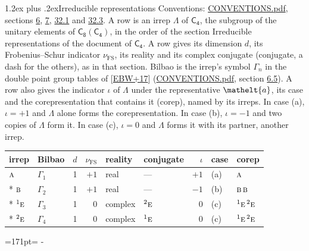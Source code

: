 \documentclass[10pt,a4paper]{article}
\makeatletter
\renewcommand\section{\@startsection{section}{1}{\z@}{-3ex plus -1ex minus -.2ex}%
  {1.2ex plus .2ex}{\normalfont\large\sffamily\bfseries\color{parttitle}}}
\newcommand{\needspace}[1]{\par\penalty-100\begingroup\dimen0=#1\relax\dimen2=\pagegoal
  \advance\dimen2-\pagetotal\ifdim\dimen0>\dimen2\relax\ifdim\dimen2>0pt\vfil\break\fi\fi
  \endgroup}
\numberwithin{equation}{section}
\newcommand{\eltfont}[1]{{\let\sigma\eltsigma\mathelt{#1}}}
\newcommand{\grp}[1]{\mathsf{#1}}
\newcommand{\irr}[1]{\text{\normalfont\scshape #1}}
\newcommand{\conjpair}[1]{{}^{#1}}
\newcommand{\elt}[1]{\eltfont{#1}}
\newcommand{\fsind}{\nu_{\mathrm{FS}}}
\makeatother
\begin{document}
\section{Irreducible representations}\label{s:irreps}
Conventions: \href{../../CONVENTIONS.pdf}{CONVENTIONS.pdf}, sections \href{../../../rotation/CONVENTIONS.pdf\#conv.6}{6}, \href{../../../rotation/CONVENTIONS.pdf\#conv.7}{7}, \href{../../CONVENTIONS.pdf\#conv.32.1}{32.1} and \href{../../CONVENTIONS.pdf\#conv.32.3}{32.3}.
\leavevmode\label{n:irrep.Delta}A row is an irrep $\Lambda$ of $\grp{C_{4}}$, the subgroup of the unitary elements of $\grp{C_{8}}(\grp{C_{4}})$, in the order of the section Irreducible representations of the document of \href{../../../rotation/data/pdf/C4.pdf}{$\grp{C_{4}}$}. \label{n:index.dimension}\label{n:index.frobenius}\label{n:head.irrep}\label{n:head.reality}\label{n:head.conjugate}A row gives its dimension $d$, its Frobenius--Schur indicator $\fsind$, its reality and its complex conjugate (conjugate, a dash for the others), as in that section. \label{n:head.bilbao}\label{n:irrep.alias.gamma}Bilbao is the irrep's symbol $\Gamma_n$ in the double point group tables of [\href{../../../REFERENCES.pdf\#ref.EBW+17}{EBW+17}] (\href{../../CONVENTIONS.pdf}{CONVENTIONS.pdf}, section \href{../../../rotation/CONVENTIONS.pdf\#conv.6.5}{6.5}). \label{n:head.case.corep}\label{n:head.corep}A row also gives the indicator $\iota$ of $\Lambda$ under the representative $\elt{a}$, its case and the corepresentation that contains it (corep), named by its irreps. In case (a), $\iota = +1$ and $\Lambda$ alone forms the corepresentation. In case (b), $\iota = -1$ and two copies of $\Lambda$ form it. In case (c), $\iota = 0$ and $\Lambda$ forms it with its partner, another irrep.
\setlength{\emergencystretch}{2em}\par\setlength{\emergencystretch}{0pt}
{\small\renewcommand{\arraystretch}{1.25}\setlength{\tabcolsep}{4pt}\begin{longtable}{@{}llrrllrll@{}}\toprule
irrep & Bilbao & $d$ & $\fsind$ & reality & conjugate & $\iota$ & case & corep\\\midrule\endhead
\bottomrule\endfoot\endlastfoot
$\irr{a}$ & $\Gamma_{1}$ & 1 & $+1$ & real & --- & $+1$ & (a) & $\irr{a}$\\*
$\irr{b}$ & $\Gamma_{2}$ & 1 & $+1$ & real & --- & $-1$ & (b) & $\irr{b}\,\irr{b}$\\*
$\conjpair{1}\irr{e}$ & $\Gamma_{3}$ & 1 & $0$ & complex & $\conjpair{2}\irr{e}$ & $0$ & (c) & $\conjpair{1}\irr{e}\,\conjpair{2}\irr{e}$\\*
$\conjpair{2}\irr{e}$ & $\Gamma_{4}$ & 1 & $0$ & complex & $\conjpair{1}\irr{e}$ & $0$ & (c) & $\conjpair{1}\irr{e}\,\conjpair{2}\irr{e}$\\
\bottomrule\end{longtable}}
\needspace{171pt}
\end{document}
